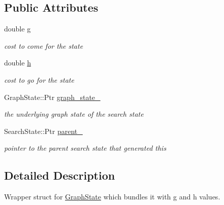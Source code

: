 \subsection*{\-Public \-Attributes}
\begin{DoxyCompactItemize}
\item 
\hypertarget{struct_search_state_ae9e94610d90e5c170fd526616a7e76c0}{double \hyperlink{struct_search_state_ae9e94610d90e5c170fd526616a7e76c0}{g}}\label{struct_search_state_ae9e94610d90e5c170fd526616a7e76c0}

\begin{DoxyCompactList}\small\item\em cost to come for the state \end{DoxyCompactList}\item 
\hypertarget{struct_search_state_ab7787161bd4feed172ba342999333132}{double \hyperlink{struct_search_state_ab7787161bd4feed172ba342999333132}{h}}\label{struct_search_state_ab7787161bd4feed172ba342999333132}

\begin{DoxyCompactList}\small\item\em cost to go for the state \end{DoxyCompactList}\item 
\hypertarget{struct_search_state_ac6770b98c7aec2eea4c15c8cf1c7e92a}{\-Graph\-State\-::\-Ptr \hyperlink{struct_search_state_ac6770b98c7aec2eea4c15c8cf1c7e92a}{graph\-\_\-state\-\_\-}}\label{struct_search_state_ac6770b98c7aec2eea4c15c8cf1c7e92a}

\begin{DoxyCompactList}\small\item\em the underlying graph state of the search state \end{DoxyCompactList}\item 
\hypertarget{struct_search_state_ac1cad42afd15a5bcc22ec6b658040c34}{\-Search\-State\-::\-Ptr \hyperlink{struct_search_state_ac1cad42afd15a5bcc22ec6b658040c34}{parent\-\_\-}}\label{struct_search_state_ac1cad42afd15a5bcc22ec6b658040c34}

\begin{DoxyCompactList}\small\item\em pointer to the parent search state that generated this \end{DoxyCompactList}\end{DoxyCompactItemize}


\subsection{\-Detailed \-Description}
\-Wrapper struct for \hyperlink{struct_graph_state}{\-Graph\-State} which bundles it with g and h values. 

